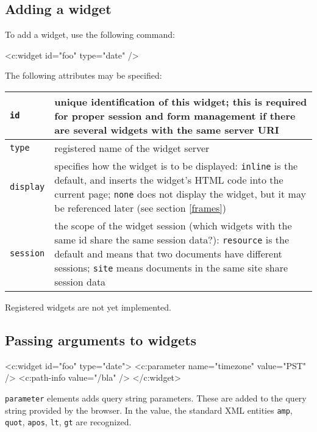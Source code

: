 \documentclass[a4paper,12pt]{article}
\begin{document}
\subsection{Adding a widget}

To add a widget, use the following command:

\begin{verbatim*}
<c:widget id="foo" type="date" />
\end{verbatim*}

The following attributes may be specified:

\begin{longtable}{|l|p{8cm}|}
\hline
\texttt{id} & unique identification of this widget; this is required
for proper session and form management if there are several widgets
with the same server URI \\
\hline
\texttt{type} & registered name of the widget server \\

\hline

\texttt{display} & specifies how the widget is to be displayed:
\texttt{inline} is the default, and inserts the widget's HTML code
into the current page; \texttt{none} does not display the widget, but
it may be referenced later (see section \ref{frames}) \\

\hline
\texttt{session} & the scope of the widget session (which widgets with
the same id share the same session data?): \texttt{resource} is the
default and means that two documents have different sessions;
\texttt{site} means documents in the same site share session data \\

\hline
\end{longtable}

Registered widgets are not yet implemented.

\subsection{Passing arguments to widgets}

\begin{verbatim*}
<c:widget id="foo" type="date">
  <c:parameter name="timezone" value="PST" />
  <c:path-info value="/bla" />
</c:widget>
\end{verbatim*}

\texttt{parameter} elements adds query string parameters.  These are
added to the query string provided by the browser.  In the value, the
standard XML entities \texttt{amp}, \texttt{quot}, \texttt{apos},
\texttt{lt}, \texttt{gt} are recognized.
\end{document}

